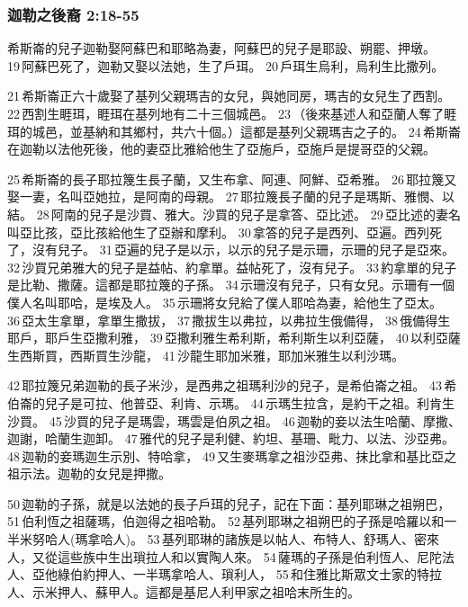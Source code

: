 \subsubsection{迦勒之後裔 2:18-55}
希斯崙的兒子迦勒娶阿蘇巴和耶略為妻，阿蘇巴的兒子是耶設、朔罷、押墩。 19 阿蘇巴死了，迦勒又娶以法她，生了戶珥。 20 戶珥生烏利，烏利生比撒列。

21 希斯崙正六十歲娶了基列父親瑪吉的女兒，與她同房，瑪吉的女兒生了西割。 22 西割生睚珥，睚珥在基列地有二十三個城邑。 23 （後來基述人和亞蘭人奪了睚珥的城邑，並基納和其鄉村，共六十個。）這都是基列父親瑪吉之子的。 24 希斯崙在迦勒以法他死後，他的妻亞比雅給他生了亞施戶，亞施戶是提哥亞的父親。

25 希斯崙的長子耶拉篾生長子蘭，又生布拿、阿連、阿鮮、亞希雅。 26 耶拉篾又娶一妻，名叫亞她拉，是阿南的母親。 27 耶拉篾長子蘭的兒子是瑪斯、雅憫、以結。 28 阿南的兒子是沙買、雅大。沙買的兒子是拿答、亞比述。 29 亞比述的妻名叫亞比孩，亞比孩給他生了亞辦和摩利。 30 拿答的兒子是西列、亞遍。西列死了，沒有兒子。 31 亞遍的兒子是以示，以示的兒子是示珊，示珊的兒子是亞來。 32 沙買兄弟雅大的兒子是益帖、約拿單。益帖死了，沒有兒子。 33 約拿單的兒子是比勒、撒薩。這都是耶拉篾的子孫。 34 示珊沒有兒子，只有女兒。示珊有一個僕人名叫耶哈，是埃及人。 35 示珊將女兒給了僕人耶哈為妻，給他生了亞太。 36 亞太生拿單，拿單生撒拔， 37 撒拔生以弗拉，以弗拉生俄備得， 38 俄備得生耶戶，耶戶生亞撒利雅， 39 亞撒利雅生希利斯，希利斯生以利亞薩， 40 以利亞薩生西斯買，西斯買生沙龍， 41 沙龍生耶加米雅，耶加米雅生以利沙瑪。

42 耶拉篾兄弟迦勒的長子米沙，是西弗之祖瑪利沙的兒子，是希伯崙之祖。 43 希伯崙的兒子是可拉、他普亞、利肯、示瑪。 44 示瑪生拉含，是約干之祖。利肯生沙買。 45 沙買的兒子是瑪雲，瑪雲是伯夙之祖。 46 迦勒的妾以法生哈蘭、摩撒、迦謝，哈蘭生迦卸。 47 雅代的兒子是利健、約坦、基珊、毗力、以法、沙亞弗。 48 迦勒的妾瑪迦生示別、特哈拿， 49 又生麥瑪拿之祖沙亞弗、抹比拿和基比亞之祖示法。迦勒的女兒是押撒。

50 迦勒的子孫，就是以法她的長子戶珥的兒子，記在下面：基列耶琳之祖朔巴， 51 伯利恆之祖薩瑪，伯迦得之祖哈勒。 52 基列耶琳之祖朔巴的子孫是哈羅以和一半米努哈人(瑪拿哈人)。 53 基列耶琳的諸族是以帖人、布特人、舒瑪人、密來人，又從這些族中生出瑣拉人和以實陶人來。 54 薩瑪的子孫是伯利恆人、尼陀法人、亞他綠伯約押人、一半瑪拿哈人、瑣利人， 55 和住雅比斯眾文士家的特拉人、示米押人、蘇甲人。這都是基尼人利甲家之祖哈末所生的。


